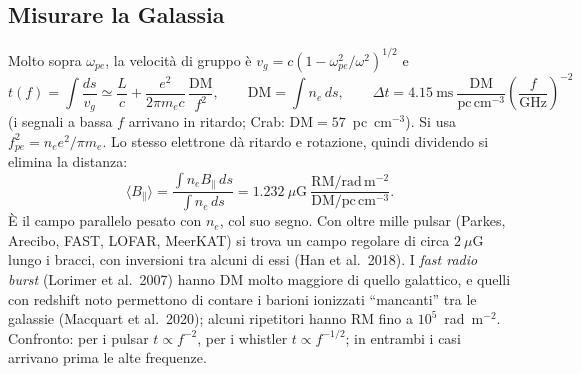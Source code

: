 \subsection{Misurare la Galassia}
Molto sopra $\omega_{pe}$, la velocità di gruppo è $v_g=c(1-\omega_{pe}^2/\omega^2)^{1/2}$ e
\begin{equation}
t(f)=\int\frac{ds}{v_g}\simeq\frac Lc+\frac{e^2}{2\pi m_ec}\,\frac{\mathrm{DM}}{f^2},\qquad\mathrm{DM}=\int n_e\,ds,\qquad\Delta t=4.15\ \mathrm{ms}\ \frac{\mathrm{DM}}{\mathrm{pc\,cm^{-3}}}\left(\frac{f}{\mathrm{GHz}}\right)^{-2}
\end{equation}
(i segnali a bassa $f$ arrivano in ritardo; Crab: $\mathrm{DM}=57$~pc~cm$^{-3}$). Si usa $f_{pe}^2=n_ee^2/\pi m_e$. Lo stesso elettrone dà ritardo e rotazione, quindi dividendo si elimina la distanza:
\begin{equation}
\langle B_\parallel\rangle=\frac{\int n_eB_\parallel\,ds}{\int n_e\,ds}=1.232\ \mu\mathrm{G}\ \frac{\mathrm{RM}/\mathrm{rad\,m^{-2}}}{\mathrm{DM}/\mathrm{pc\,cm^{-3}}}.
\end{equation}
È il campo parallelo pesato con $n_e$, col suo segno. Con oltre mille pulsar (Parkes, Arecibo, FAST, LOFAR, MeerKAT) si trova un campo regolare di circa $2~\mu$G lungo i bracci, con inversioni tra alcuni di essi (Han et al.~2018). I \emph{fast radio burst} (Lorimer et al.~2007) hanno DM molto maggiore di quello galattico, e quelli con redshift noto permettono di contare i barioni ionizzati ``mancanti'' tra le galassie (Macquart et al.~2020); alcuni ripetitori hanno $\mathrm{RM}$ fino a $10^5$~rad~m$^{-2}$. Confronto: per i pulsar $t\propto f^{-2}$, per i whistler $t\propto f^{-1/2}$; in entrambi i casi arrivano prima le alte frequenze.

